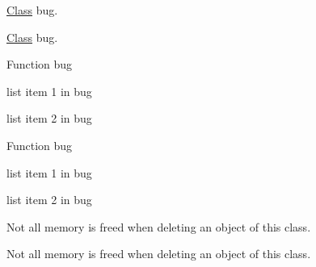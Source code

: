 
\begin{DoxyRefList}
\item[\mbox{\hyperlink{class_class}{Class}} \mbox{\hyperlink{class_bug}{Bug}} ]\label{bug__bug000002}%
%
\mbox{\hyperlink{class_class}{Class}} bug. 

\label{bug__bug000005}%
%
\mbox{\hyperlink{class_class}{Class}} bug.  
\item[Member \mbox{\hyperlink{class_bug_a1f720954dd97cd1203e80501a6eae74c}{Bug\+::foo}} ()]\label{bug__bug000003}%
%
Function bug
\begin{DoxyItemize}
\item list item 1 in bug
\item list item 2 in bug
\end{DoxyItemize}

\label{bug__bug000006}%
%
Function bug
\begin{DoxyItemize}
\item list item 1 in bug
\item list item 2 in bug 
\end{DoxyItemize}
\item[\mbox{\hyperlink{class_class}{Class}} \mbox{\hyperlink{class_some_nice_class}{Some\+Nice\+Class}} ]\label{bug__bug000001}%
%
Not all memory is freed when deleting an object of this class. 

\label{bug__bug000004}%
%
Not all memory is freed when deleting an object of this class. 
\end{DoxyRefList}
